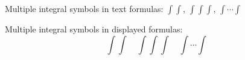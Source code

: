\documentclass{article}
\newcommand{\iint}{\int\!\!\!\int}
\newcommand{\iiint}{\int\!\!\!\int\!\!\!\int}
\newcommand{\idotsint}{\int\cdots\int}
\begin{document}
\noindent
Multiple integral symbols in text formulas: $\iint$, $\iiint$, $\idotsint$

\noindent Multiple integral symbols in displayed formulas:
\[ \iint\quad\iiint\quad\idotsint \]
\end{document}
